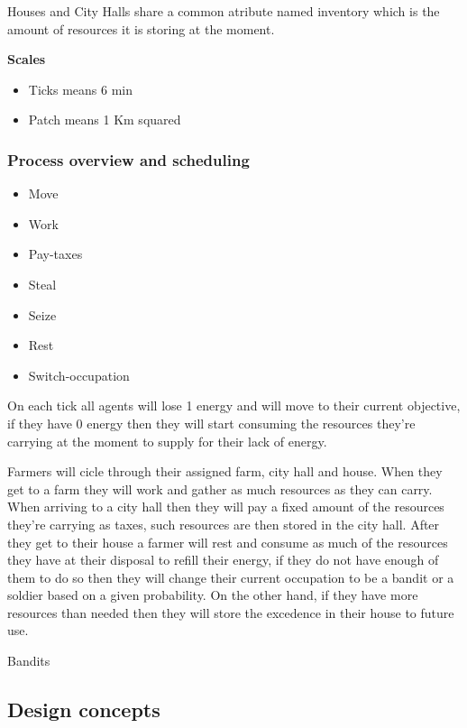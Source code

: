 \documentclass{wscpaperproc}
\theoremstyle{wsc}
\begin{document}
\noindent Houses and City Halls share a common atribute named inventory which is the amount of
resources it is storing at the moment.\hfill\break

\noindent \textbf{Scales}

\begin{itemize}
    \item Ticks means 6 min
    \item Patch means 1 Km squared
\end{itemize}

\subsubsection{Process overview and scheduling}

\begin{itemize}
    \item Move
    \item Work
    \item Pay-taxes
    \item Steal
    \item Seize
    \item Rest
    \item Switch-occupation
\end{itemize}

On each tick all agents will lose 1 energy and will move to their current objective, if they have 0
energy then they will start consuming the resources they're carrying at the moment to supply for
their lack of energy.

Farmers will cicle through their assigned farm, city hall and house.
When they get to a farm they will work and gather as much resources as they can carry.
When arriving to a city hall then they will pay a fixed amount of the resources they're carrying as
taxes, such resources are then stored in the city hall.
After they get to their house a farmer will rest and consume as much of the resources they have at
their disposal to refill their energy, if they do not have enough of them to do so then they will
change their current occupation to be a bandit or a soldier based on a given probability. On the
other hand, if they have more resources than needed then they will store the excedence in their house
to future use.

Bandits

\subsection{Design concepts}
\end{document}
